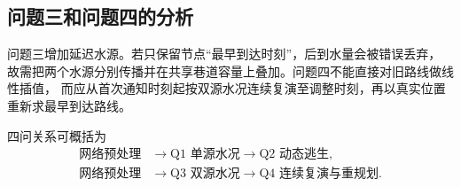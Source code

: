 \subsection{问题三和问题四的分析}
问题三增加延迟水源。若只保留节点“最早到达时刻”，后到水量会被错误丢弃，
故需把两个水源分别传播并在共享巷道容量上叠加。问题四不能直接对旧路线做线性插值，
而应从首次通知时刻起按双源水况连续复演至调整时刻，再以真实位置重新求最早到达路线。

四问关系可概括为
\begin{align*}
\text{网络预处理}&\longrightarrow\text{Q1 单源水况}\longrightarrow\text{Q2 动态逃生},\\
\text{网络预处理}&\longrightarrow\text{Q3 双源水况}\longrightarrow\text{Q4 连续复演与重规划}.
\end{align*}
